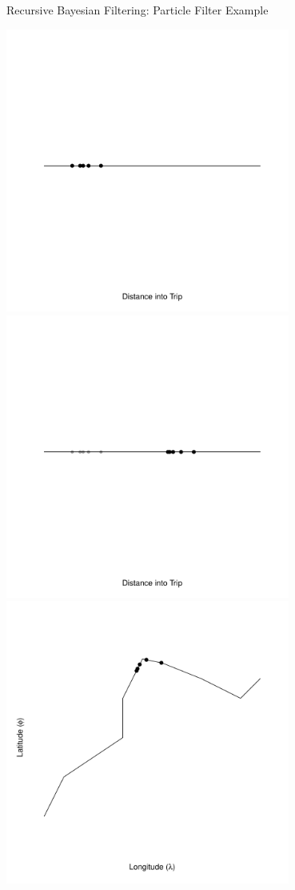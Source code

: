 \documentclass[10pt,t]{beamer}
\begin{document}
\begin{frame}{Recursive Bayesian Filtering: Particle Filter Example}
  \vspace{-1em}
  \begin{overprint}
    \centering
    \includegraphics[width=0.7\textwidth]{figs/pf2-frame1.pdf}
    \centering
    \includegraphics[width=0.7\textwidth]{figs/pf2-frame2.pdf}
    \centering
    \includegraphics[width=0.7\textwidth]{figs/pf2-frame3.pdf}

\end{overprint}
\end{frame}
\end{document}
